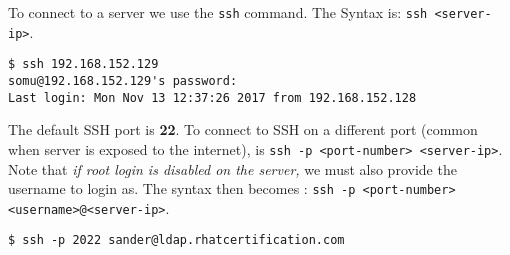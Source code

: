 To connect to a server we use the \verb|ssh| command. The Syntax is: \verb|ssh <server-ip>|.

\begin{verbatim}
$ ssh 192.168.152.129
somu@192.168.152.129's password:
Last login: Mon Nov 13 12:37:26 2017 from 192.168.152.128
\end{verbatim}

The default SSH port is \textbf{22}. To connect to SSH on a different port (common when server is exposed to the internet), is \verb|ssh -p <port-number> <server-ip>|. Note that \textit{if root login is disabled on the server,} we must also provide the username to login as. The syntax then becomes : \verb|ssh -p <port-number> <username>@<server-ip>|.

\begin{verbatim}
$ ssh -p 2022 sander@ldap.rhatcertification.com
\end{verbatim}

